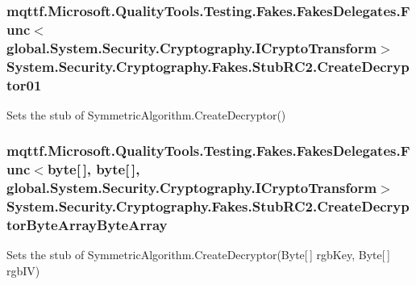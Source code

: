 \hypertarget{class_system_1_1_security_1_1_cryptography_1_1_fakes_1_1_stub_r_c2_a601514d1e1b8f1c7eb4378e7622a8be8}{
\subsubsection[{Create\-Decryptor01}]{\setlength{\rightskip}{0pt plus 5cm}mqttf.\-Microsoft.\-Quality\-Tools.\-Testing.\-Fakes.\-Fakes\-Delegates.\-Func$<$global.\-System.\-Security.\-Cryptography.\-I\-Crypto\-Transform$>$ System.\-Security.\-Cryptography.\-Fakes.\-Stub\-R\-C2.\-Create\-Decryptor01}}\label{class_system_1_1_security_1_1_cryptography_1_1_fakes_1_1_stub_r_c2_a601514d1e1b8f1c7eb4378e7622a8be8}


Sets the stub of Symmetric\-Algorithm.\-Create\-Decryptor()

\hypertarget{class_system_1_1_security_1_1_cryptography_1_1_fakes_1_1_stub_r_c2_aff87e3aa83844f20d7f7368bb0891267}{
\subsubsection[{Create\-Decryptor\-Byte\-Array\-Byte\-Array}]{\setlength{\rightskip}{0pt plus 5cm}mqttf.\-Microsoft.\-Quality\-Tools.\-Testing.\-Fakes.\-Fakes\-Delegates.\-Func$<$byte\mbox{[}$\,$\mbox{]}, byte\mbox{[}$\,$\mbox{]}, global.\-System.\-Security.\-Cryptography.\-I\-Crypto\-Transform$>$ System.\-Security.\-Cryptography.\-Fakes.\-Stub\-R\-C2.\-Create\-Decryptor\-Byte\-Array\-Byte\-Array}}\label{class_system_1_1_security_1_1_cryptography_1_1_fakes_1_1_stub_r_c2_aff87e3aa83844f20d7f7368bb0891267}


Sets the stub of Symmetric\-Algorithm.\-Create\-Decryptor(\-Byte\mbox{[}$\,$\mbox{]} rgb\-Key, Byte\mbox{[}$\,$\mbox{]} rgb\-I\-V)

